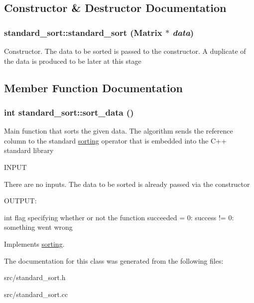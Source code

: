 \subsection{Constructor \& Destructor Documentation}
\hypertarget{classstandard__sort_a70a7e1ba1cae2d294b252f6182f81436}{
\subsubsection[{standard\_\-sort}]{\setlength{\rightskip}{0pt plus 5cm}standard\_\-sort::standard\_\-sort ({\bf Matrix} $\ast$ {\em data})}}
\label{d4/dec/classstandard__sort_a70a7e1ba1cae2d294b252f6182f81436}


Constructor. The data to be sorted is passed to the constructor. A duplicate of the data is produced to be later at this stage 

\subsection{Member Function Documentation}
\hypertarget{classstandard__sort_a34a0d914ebac6e328dfe371a1e1a8afb}{
\subsubsection[{sort\_\-data}]{\setlength{\rightskip}{0pt plus 5cm}int standard\_\-sort::sort\_\-data ()}}
\label{d4/dec/classstandard__sort_a34a0d914ebac6e328dfe371a1e1a8afb}


Main function that sorts the given data. The algorithm sends the reference column to the standard \hyperlink{classsorting}{sorting} operator that is embedded into the C++ standard library

\begin{DoxyVerb}
  INPUT 

  There are no inputs. The data to be sorted is already passed via the constructor

  OUTPUT:

  int       flag specifying whether or not the function succeeded
             = 0: success
	    != 0: something went wrong

\end{DoxyVerb}
 

Implements \hyperlink{classsorting_a94c4b729732743299f3dcd2505312381}{sorting}.

The documentation for this class was generated from the following files:\begin{DoxyCompactItemize}
\item 
src/standard\_\-sort.h\item 
src/standard\_\-sort.cc\end{DoxyCompactItemize}
